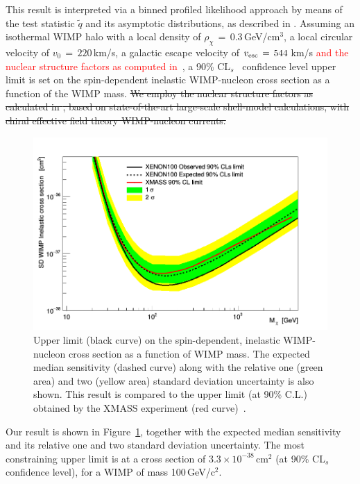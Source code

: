 This result is interpreted via a binned profiled likelihood approach by means of the test statistic $\tilde{q}$
and its asymptotic distributions, as  described in \cite{asympt}. 
Assuming  an isothermal WIMP halo with a local density of $\rho_{\chi} \, = \, 0.3$\,GeV/cm$^3$, a local circular velocity of $v_0 \,= \, 220$\,km/s, 
a galactic escape velocity of $v_{\rm{esc}} \, = \, 544$\,km/s 
\textcolor{red} {and the nuclear structure factors as computed in}~\cite{Baudis:2013qla}, 
a 90\% CL$_s$~\cite{cls} confidence level upper limit is set on the spin-dependent inelastic WIMP-nucleon cross section as a function of the WIMP mass. 
\sout{We employ the nuclear structure factors as calculated in \cite{Baudis:2013qla}, based on state-of-the-art large-scale shell-model calculations, with chiral effective field theory WIMP-nucleon currents.}

\begin{figure}[th]
  \includegraphics[width=\linewidth]{images/limit_reb.png}
  \caption{Upper limit (black curve) on the spin-dependent, inelastic WIMP-nucleon cross section as a function of WIMP mass.  The expected median sensitivity (dashed curve) along with the relative one (green area) and two (yellow area) standard deviation uncertainty is also shown. This result is compared to the upper limit (at 90\% C.L.) obtained by the XMASS experiment (red curve)~\cite{Uchida:2014cnn}.}
  \label{fig:limits}
\end{figure}


Our result is shown in Figure~\ref{fig:limits}, together with the expected median sensitivity and its relative one and two  standard deviation uncertainty.
The most constraining upper limit is  at a cross section of $3.3 \times 10^{-38}$\,cm$^{2}$ (at 90\% CL$_s$ confidence level), for a WIMP of mass 100\,GeV/c$^2$. 

